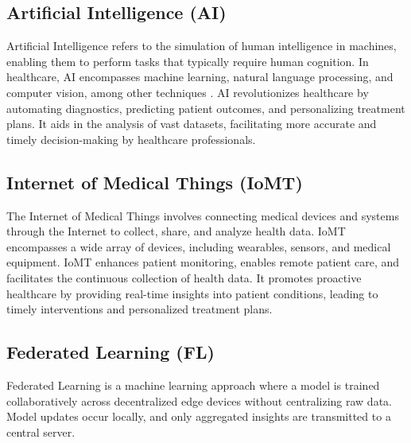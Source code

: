 \documentclass[conference]{IEEEtran}
\begin{document}
\subsection{Artificial Intelligence (AI)}

Artificial Intelligence refers to the simulation of human intelligence in machines, enabling them to perform tasks that typically require human cognition. In healthcare, AI encompasses machine learning, natural language processing, and computer vision, among other techniques \cite{9, 11, 12}. AI revolutionizes healthcare by automating diagnostics, predicting patient outcomes, and personalizing treatment plans. It aids in the analysis of vast datasets, facilitating more accurate and timely decision-making by healthcare professionals.

\subsection{Internet of Medical Things (IoMT)}

The Internet of Medical Things involves connecting medical devices and systems through the Internet to collect, share, and analyze health data. IoMT\cite{1} encompasses a wide array of devices, including wearables, sensors, and medical equipment. IoMT enhances patient monitoring, enables remote patient care, and facilitates the continuous collection of health data. It promotes proactive healthcare by providing real-time insights into patient conditions, leading to timely interventions and personalized treatment plans.

\subsection{Federated Learning (FL)}

Federated Learning is a machine learning approach where a model is trained collaboratively across decentralized edge\cite{3}  devices without centralizing raw data. Model updates occur locally, and only aggregated insights are transmitted to a central server.
\end{document}
